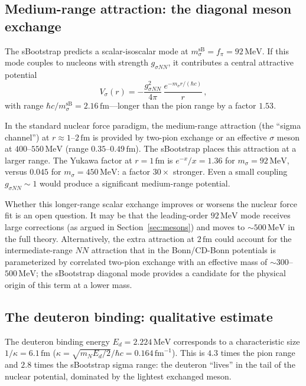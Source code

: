 \documentclass[12pt,a4paper]{article}
\newcommand{\MeV}{\,\text{MeV}}
\newcommand{\fpi}{f_\pi}
\begin{document}
\subsection{Medium-range attraction: the diagonal meson exchange}

The sBootstrap predicts a scalar-isoscalar mode at $m_\sigma^{\text{sB}}
= \fpi = 92\MeV$.  If this mode couples to nucleons with strength
$g_{\sigma NN}$, it contributes a central attractive potential
\begin{equation}
  V_\sigma(r) = -\frac{g_{\sigma NN}^2}{4\pi}\,
    \frac{e^{-m_\sigma r/(\hbar c)}}{r}\,,
\end{equation}
with range $\hbar c / m_\sigma^{\text{sB}} = 2.16\,\text{fm}$---longer
than the pion range by a factor $1.53$.

In the standard nuclear force paradigm, the medium-range attraction
(the ``sigma channel'') at $r \approx 1$--$2\,\text{fm}$ is
provided by two-pion exchange or an effective $\sigma$ meson at
$400$--$550\MeV$ (range $0.35$--$0.49\,\text{fm}$).  The sBootstrap
places this attraction at a larger range.  The Yukawa factor at
$r = 1\,\text{fm}$ is $e^{-x}/x = 1.36$ for $m_\sigma = 92\MeV$,
versus $0.045$ for $m_\sigma = 450\MeV$: a factor $30\times$ stronger.
Even a small coupling $g_{\sigma NN} \sim 1$ would produce a significant
medium-range potential.

Whether this longer-range scalar exchange improves or worsens the
nuclear force fit is an open question.  It may be that the leading-order
$92\MeV$ mode receives large corrections (as argued in
Section~\ref{sec:mesons}) and moves to $\sim 500\MeV$ in the full
theory.  Alternatively, the extra attraction at $2\,\text{fm}$ could
account for the intermediate-range $NN$ attraction that in the
Bonn/CD-Bonn potentials is parameterized by correlated two-pion
exchange with an effective mass of $\sim 300$--$500\MeV$; the sBootstrap
diagonal mode provides a candidate for the physical origin of this term
at a lower mass.

\subsection{The deuteron binding: qualitative estimate}

The deuteron binding energy $E_d = 2.224\MeV$ corresponds to a
characteristic size $1/\kappa = 6.1\,\text{fm}$
($\kappa = \sqrt{m_N E_d/2}/\hbar c = 0.164\,\text{fm}^{-1}$).
This is $4.3$ times the pion range and $2.8$ times the sBootstrap
sigma range: the deuteron ``lives'' in the tail of the nuclear potential,
dominated by the lightest exchanged meson.
\end{document}
